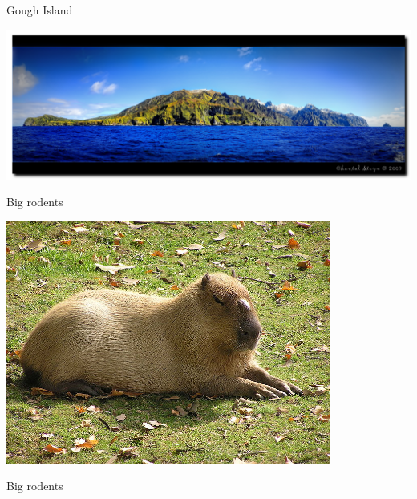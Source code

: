 \documentclass[12pt]{article}
\newcommand{\headsize}{\fontsize{35}{35} \selectfont}
\begin{document}
\newpage

\addtocounter{page}{-1}

\headsize \color{myyellow}
\hfill \begin{minipage}{5.75in}
\centering
Gough Island
\end{minipage}

\vspace{25mm}

\centerline{\includegraphics[width=\textwidth]{Figs/gough_wholeisland.jpg}}



\newpage

\headsize \color{myyellow}
\hfill \begin{minipage}{5.75in}
\centering
Big rodents
\end{minipage}

\vspace{10mm}

\centerline{\includegraphics[width=0.8\textwidth]{Figs/capybara.jpg}}




\newpage

\addtocounter{page}{-1}

\headsize \color{myyellow}
\hfill \begin{minipage}{5.75in}
\centering
Big rodents
\end{minipage}
\end{document}
